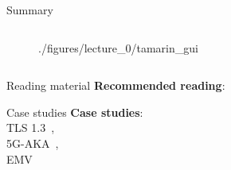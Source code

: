 \documentclass[11pt,aspectratio=169]{beamer}
\begin{document}
\begin{frame}[fragile]{Summary}
\begin{columns}
\begin{column}{0.35\textwidth}
\begin{figure}
                    {./figures/lecture_0/tamarin_gui}
            \end{figure}
        \end{column}
    \end{columns}
\end{frame}

\begin{frame}[fragile]{Reading material}
    \textbf{Recommended reading}:
        ~\cite[Ch. 1--2]{tamarin-book}
    \begin{refsection} 
        \nocite{tamarin-book}
        \printbibliography[heading=none]
    \end{refsection}
\end{frame}

\begin{frame}[allowframebreaks]{Case studies}
    \textbf{Case studies}:\\ \;
        TLS 1.3~\cite{cremers2016tls13,cremers2017tls13},\\ \;
        5G-AKA~\cite{basin20185gaka,cremers20195gaka},\\ \;
        EMV~\cite{basin2021emv,basin2021emvmixup,radu2022emv}
    \begin{refsection} 
        \nocite{cremers2016tls13,cremers2017tls13,basin20185gaka,
                cremers20195gaka,basin2021emv,basin2021emvmixup,radu2022emv}
        \printbibliography[heading=none]
    \end{refsection}
\end{frame}
\end{document}
